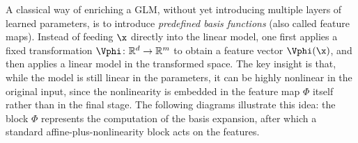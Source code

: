 \begin{center}
\end{center}

\medskip
A classical way of enriching a GLM, without yet introducing multiple layers of learned parameters, is to introduce \emph{predefined basis functions} (also called feature maps). Instead of feeding $\x$ directly into the linear model, one first applies a fixed transformation $\Vphi \colon \mathbb{R}^d \to \mathbb{R}^m$ to obtain a feature vector $\Vphi(\x)$, and then applies a linear model in the transformed space. The key insight is that, while the model is still linear in the parameters, it can be highly nonlinear in the original input, since the nonlinearity is embedded in the feature map $\Phi$ itself rather than in the final stage. The following diagrams illustrate this idea: the block $\Phi$ represents the computation of the basis expansion, after which a standard affine-plus-nonlinearity block acts on the features.

